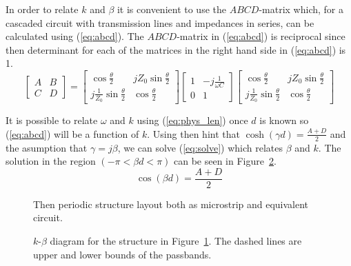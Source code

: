 \documentclass[12pt,a4paper]{article}
\begin{document}
In order to relate $k$ and $\beta$ it is convenient to use the $ABCD$-matrix which, for a cascaded circuit with transmission lines and impedances in series, can be calculated using (\ref{eq:abcd}). The $ABCD$-matrix in (\ref{eq:abcd}) is reciprocal since then determinant for each of the matrices in the right hand side in (\ref{eq:abcd}) is 1.
\begin{equation}
  \label{eq:abcd}
  \begin{bmatrix}
    A & B \\
    C & D
  \end{bmatrix} =
  \begin{bmatrix}
    \cos\frac{\theta}{2} & jZ_0\sin\frac{\theta}{2} \\
    j\frac{1}{Z_0}\sin\frac{\theta}{2} & \cos\frac{\theta}{2}
  \end{bmatrix}
  \begin{bmatrix}
    1 & -j\frac{1}{\omega C} \\
    0 & 1
  \end{bmatrix}
  \begin{bmatrix}
    \cos\frac{\theta}{2} & jZ_0\sin\frac{\theta}{2} \\
    j\frac{1}{Z_0}\sin\frac{\theta}{2} & \cos\frac{\theta}{2}
  \end{bmatrix}
\end{equation}

It is possible to relate $\omega$ and $k$ using (\ref{eq:phys_len}) once $d$ is known so (\ref{eq:abcd}) will be a function of $k$.
Using then hint that $\cosh(\gamma d) = \frac{A+D}{2}$ and the asumption that $\gamma = j\beta$, we can solve (\ref{eq:solve}) which relates $\beta$ and $k$. The solution in the region $(-\pi < \beta d < \pi)$ can be seen in Figure~\ref{fig:kbeta}.
\begin{equation}
  \label{eq:solve}
  \cos(\beta d) = \frac{A+D}{2}
\end{equation}
\begin{figure}
  \centering
  \noindent\makebox[\textwidth]{\scalebox{0.7}{}}
  \caption{Then periodic structure layout both as microstrip and equivalent circuit.}
  \label{fig:periodic_struct}
\end{figure}

\begin{figure}
  \centering
  \noindent\makebox[\textwidth]{\scalebox{0.9}{}}
  \caption{$k$-$\beta$ diagram for the structure in Figure~\ref{fig:periodic_struct}. The dashed lines are upper and lower bounds of the passbands.}
  \label{fig:kbeta}
\end{figure}
\end{document}
